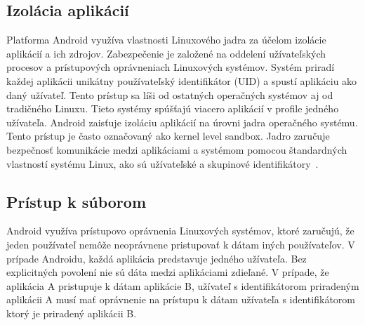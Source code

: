 \subsection{Izolácia aplikácií}
Platforma Android využíva vlastnosti Linuxového jadra za účelom izolácie aplikácií a ich zdrojov. Zabezpečenie je založené na oddelení užívateľských procesov a prístupových oprávneniach Linuxových systémov. Systém priradí každej aplikácii unikátny používateľský identifikátor (UID) a spustí aplikáciu ako daný užívateľ. Tento prístup sa líši od ostatných operačných systémov aj od tradičného Linuxu. Tieto systémy spúšťajú viacero aplikácií v profile jedného užívateľa.
Android zaisťuje izoláciu aplikácií na úrovni jadra operačného systému. Tento prístup je často označovaný ako kernel level sandbox. Jadro zaručuje bezpečnosť komunikácie medzi aplikáciami a systémom pomocou štandardných vlastností systému Linux, ako sú užívateľské a skupinové identifikátory~\cite{KernelSecurity}. 

\subsection{Prístup k súborom}
Android využíva prístupovo oprávnenia Linuxových systémov, ktoré zaručujú, že jeden používateľ nemôže neoprávnene pristupovať k dátam iných používateľov. V prípade Androidu, každá aplikácia predstavuje jedného užívateľa. Bez explicitných povolení nie sú dáta medzi aplikáciami zdieľané. V prípade, že aplikácia A pristupuje k dátam aplikácie B, užívateľ s identifikátorom  priradeným aplikácii A musí mať oprávnenie na prístupu k dátam užívateľa s identifikátorom ktorý je priradený aplikácii B. 